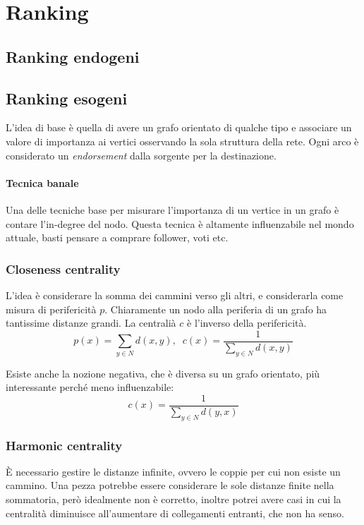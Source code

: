 \section{Ranking}

\subsection{Ranking endogeni}

\subsection{Ranking esogeni}

L'idea di base è quella di avere un grafo orientato di qualche tipo e associare 
un valore di importanza ai vertici osservando la sola struttura della rete.
Ogni arco è considerato un \emph{endorsement} dalla sorgente per la 
destinazione.

\paragraph{Tecnica banale}
Una delle tecniche base per misurare l'importanza di un vertice in un grafo 
è contare l'in-degree del nodo. Questa tecnica è altamente influenzabile nel 
mondo attuale, basti pensare a comprare follower, voti etc.

\subsubsection{Closeness centrality}
L'idea è considerare la somma dei cammini verso gli altri, e considerarla 
come misura di perifericità $p$. Chiaramente un nodo alla periferia di un grafo 
ha tantissime distanze grandi. La centralià $c$ è l'inverso della perifericità.
$$p(x) = \sum_{y \in N} d(x, y),\;\;c(x) = \frac{1}{\sum_{y \in N} d(x, y)}$$

Esiste anche la nozione negativa, che è diversa su un grafo orientato, più
interessante perché meno influenzabile:
$$c(x) = \frac{1}{\sum_{y \in N} d(y, x)}$$

\subsubsection{Harmonic centrality}
È necessario gestire le distanze infinite, ovvero le coppie per cui non 
esiste un cammino. Una pezza potrebbe essere considerare le sole distanze finite
nella sommatoria, però idealmente non è corretto, inoltre potrei avere casi in 
cui la centralità diminuisce all'aumentare di collegamenti entranti, che non ha 
senso.

